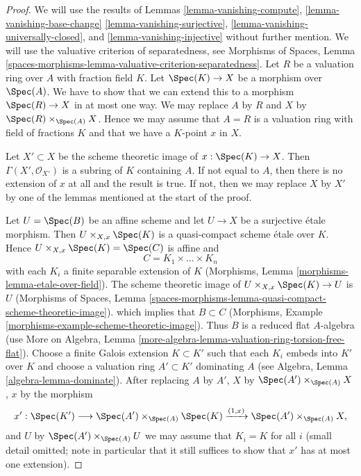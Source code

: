 \begin{proof}
We will use the results of
Lemmas \ref{lemma-vanishing-compute},
\ref{lemma-vanishing-base-change}
\ref{lemma-vanishing-surjective},
\ref{lemma-vanishing-universally-closed}, and
\ref{lemma-vanishing-injective}
without further mention.
We will use the valuative criterion of separatedness, see
Morphisms of Spaces, Lemma
\ref{spaces-morphisms-lemma-valuative-criterion-separatedness}.
Let $R$ be a valuation ring over $A$ with fraction field $K$.
Let $\Spec(K) \to X$ be a morphism over $\Spec(A)$. We have
to show that we can extend this to a morphism $\Spec(R) \to X$
in at most one way. We may replace $A$ by $R$ and $X$ by
$\Spec(R) \times_{\Spec(A)} X$. Hence we may assume that $A = R$
is a valuation ring with field of fractions $K$ and that we have a
$K$-point $x$ in $X$.

\medskip\noindent
Let $X' \subset X$ be the scheme theoretic image of $x : \Spec(K) \to X$.
Then $\Gamma(X', \mathcal{O}_{X'})$ is a subring of $K$ containing
$A$. If not equal to $A$, then there is no extension of $x$ at all
and the result is true. If not, then we may replace $X$ by $X'$
by one of the lemmas mentioned at the start of the proof.

\medskip\noindent
Let $U = \Spec(B)$ be an affine scheme and let $U \to X$ be a
surjective \'etale morphism. Then $U \times_{X, x} \Spec(K)$
is a quasi-compact scheme \'etale over $K$.
Hence $U \times_{X, x} \Spec(K) = \Spec(C)$ is affine and
$$
C = K_1 \times \ldots \times K_n
$$
with each $K_i$ a finite separable extension of $K$
(Morphisms, Lemma \ref{morphisms-lemma-etale-over-field}).
The scheme theoretic image of $U \times_{X, x} \Spec(K) \to U$ is $U$
(Morphisms of Spaces, Lemma
\ref{spaces-morphisms-lemma-quasi-compact-scheme-theoretic-image}).
which implies that $B \subset C$ (Morphisms, Example
\ref{morphisms-example-scheme-theoretic-image}).
Thus $B$ is a reduced flat $A$-algebra (use More on Algebra, Lemma
\ref{more-algebra-lemma-valuation-ring-torsion-free-flat}).
Choose a finite Galois extension $K \subset K'$ such that each $K_i$
embeds into $K'$ over $K$ and choose a valuation ring $A' \subset K'$
dominating $A$ (see
Algebra, Lemma \ref{algebra-lemma-dominate}).
After replacing $A$ by $A'$, $X$ by $\Spec(A') \times_{\Spec(A)} X$,
$x$ by the morphism
$$
x' : \Spec(K') \longrightarrow \Spec(A') \times_{\Spec(A)} \Spec(K)
\xrightarrow{(1, x)} \Spec(A') \times_{\Spec(A)} X,
$$
and $U$ by $\Spec(A') \times_{\Spec(A)} U$
we may assume that $K_i = K$ for all $i$ (small detail omitted;
note in particular that it still suffices to show that $x'$ has at
most one extension).


\end{proof}
